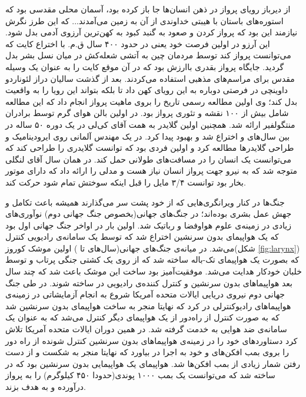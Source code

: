 از دیرباز رویای پرواز در ذهن انسان‌ها جا باز کرده بود، آسمان محلی مقدسی بود که استوره‌های باستان با هیبتی خداوندی از آن به زمین می‌آمدند... که این طرز نگرش نیازمند این بود که پرواز کردن و صعود به گنبد کبود به کهن‌ترین آرزوی آدمی بدل شود. این آرزو در اولین فرصت خود یعنی در حدود ۴۰۰ سال ق.م. با اختراع کایت که می‌توانست پرواز کند توسط مردمان چین به آتشی شعله‌کش در میان نسل بشر بدل گردید. جایگاه پرواز بقدری باارزش بود که در آن موقع کایت را به عنوان یک وسیله مقدس برای مراسم‌های مذهبی استفاده می‌کردند. بعد از گذشت سالیان دراز لئوناردو داوینچی در  فرصتی دوباره به این رویای کهن داد تا بلکه بتواند این رویا را به واقعیت بدل کند؛ وی اولین مطالعه رسمی تاریخ را بروی ماهیت پرواز انجام داد که این مطالعه شامل بیش از ۱۰۰ نقشه و تئوری پرواز بود. در  اولین بالن هوای گرم توسط برادران منتگولفیر ارائه شد. همچنین اولین گلایدر به همت آقای کی‌لی در یک دوره ۵۰ ساله در بین سال‌های  و  اختراع شد و بهبود پیدا کرد. در  یک مهندس آلمانی روی ایرودینامیک و طراحی گلایدرها مطالعه کرد و اولین فردی بود که توانست گلایدری را طراحی کند که می‌توانست یک انسان را در مسافت‌های طولانی حمل کند. در همان سال آقای لنگلی متوجه شد که به نیرو جهت پرواز انسان نیاز هست و مدلی را ارائه داد که دارای موتور بخار بود توانست ۳/۴ مایل را قبل اینکه سوختش تمام شود حرکت کند.

جنگ‌ها در کنار ویرانگری‌هایی که از خود پشت سر می‌گذارند همیشه باعث تکامل و جهش عمل بشری بوده‌اند؛ در جنگ‌های جهانی(بخصوص جنگ جهانی دوم) نوآوری‌های زیادی در زمینه‌ی علوم هواوفضا و رباتیک شد. اولین بار در اواخر جنگ جهانی اول بود که یک هواپیمای بدون سرنشین اختراع شد که توسط یک سامانه‌ی رادیویی کنترل می‌شد. در میانه‌ی جنگ‌های جهانی(سال‌های  تا ) اولین موشک کوروز(شکل \ref{fig:larynx}) که بصورت یک هواپیمای تک-باله ساخته شد که از روی یک کشتی جنگی پرتاب و توسط خلبان خودکار هدایت می‌شد. موفقیت‌آمیز بود ساخت این موشک باعث شد که چند سال بعد هواپیماهای بدون سرنشین و کنترل کننده‌ی رادیویی در  ساخته شوند. در طی جنگ جهانی دوم نیروی دریایی ایالات متحده آمریکا شروع به انجام آزمایشاتی در زمینه‌ی هواپیما‌های رادیوکنترلی در  کرد که نهایتا منجر به ساخت هواپیمای بدون سرنشین  شد که به صورت کنترل از راه‌دور از یک هواپیمای دیگر کنترل می‌شد که به عنوان یک سامانه‌ی ضد هوایی به خدمت گرفته شد. در همین دوران ایالات متحده آمریکا تلاش کرد دستاوردهای خود را در زمینه‌ی هواپیماهای بدون سرنشین کنترل شونده از راه دور را بروی بمب افکن‌های  و  خود به اجرا در بیاورد که نهایتا منجر به شکست و از دست رفتن شمار زیادی از بمب افکن‌ها شد. هواپیمای  یک هواپیمایی بدون سرنشین بود که در  ساخته شد که می‌توانست یک بمب ۱۰۰۰ پوندی(حدودا ۴۵۰ کیلوگرم) را به پرواز درآورده و به هدف بزند.


